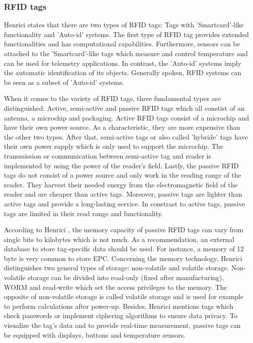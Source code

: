 \subsubsection{RFID tags} \label{tags}

Henrici \cite{henrici} states that there are two types of RFID tags: Tags with 'Smartcard'-like functionality and 'Auto-id' systems. The first type of RFID tag  provides extended functionalities and has computational capabilities. Furthermore, sensors can be attached to the 'Smartcard'-like tags which measure and control temperature and can be used for telemetry applications. In contrast, the 'Auto-id' systems imply the automatic identification of its objects. Generally spoken, RFID systems can be seen as a subset of 'Auto-id' systems.

When it comes to the variety of RFID tags, three fundamental types are distinguished: Active, semi-active and passive RFID tags \cite{henrici} which all constist of an antenna, a microchip and packaging. Active RFID tags consist of a microchip and have their own power source. As a characteristic, they are more expensive than the other two types. After that, semi-active tags or also called 'hybride' tags have their own power supply which is only used to support the microchip. The transmission or communication between semi-active tag and reader is implemented by using the power of the reader's field. Lastly, the passive RFID tags do not consist of a power source and only work in the reading range of the reader. They harvest their needed energy from the electromagnetic field of the reader and are cheaper than active tags. Moreover, passive tags are lighter than active tags and provide a long-lasting service. In constrast to active tags, passive tags are limited in their read range and functionality.

According to Henrici \cite{henrici}, the memory capacity of passive RFID tags can vary from single bits to kilobytes which is not much. As a recommendation, an external database to store tag-specific data should be used. For instance, a memory of 12 byte is very common to store \ac{EPC}. Concerning the memory technology, Henrici distinguishes two general types of storage: non-volatile and volatile storage. Non-volatile storage can be divided into read-only (fixed after manufacturing), \ac{WORM} and read-write which set the access privileges to the memory. The opposite of non-volatile storage is called volatile storage and is used for example to perform calculations after power-up. Besides, Henrici mentions tags which check passwords or implement ciphering algorithms to ensure data privacy. To visualize the tag's data and to provide real-time measurement, passive tags can be equipped with displays, buttons and temperature sensors. 

